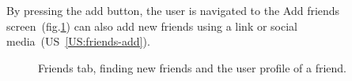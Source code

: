 By pressing the add button, the user is navigated to the Add friends screen~(fig.\ref{fig:friends}) can also add new friends using a link or social media~(US~\ref{US:friends-add}).

\begin{figure}[h!]
    \centering
    \hfill
    \hfill
    \caption{Friends tab, finding new friends and the user profile of a friend.}
    \label{fig:friends}
\end{figure}

